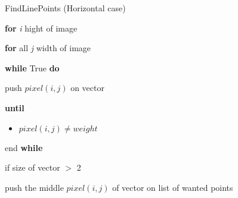 \documentclass[../Head/Main.tex]{subfiles}
\begin{document}
\begin{Pseudo}{FindLinePoints (Horizontal case)}{}

 	\textbf{for} \textit{i} hight of image 
	\begin{Indentation}
		\item 
	\begin{Indentation}
	\item \textbf{for} all \textit{j} width of image 
	\item \textbf{while} True \textbf{do}
	\item push $pixel(i,j)$ on vector
	
	\item \textbf{until}
				
	\begin{itemize}
	\item $pixel(i,j) \neq weight$  
	\end{itemize}
	
	\item end \textbf{while} 
	
	\item if size of vector $>$ 2
	\item push the middle $pixel(i,j)$ of vector on list of wanted points
	\end{Indentation}
	
	\end{Indentation}

	
\end{Pseudo} 
\end{document}
